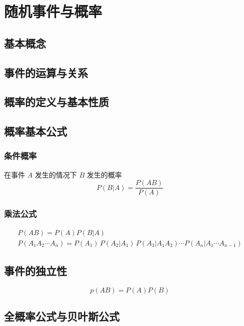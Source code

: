 \chapter{随机事件与概率}

\section{基本概念}
\label{sec:基本概念}

\section{事件的运算与关系}
\label{sec:事件的运算与关系}

\section{概率的定义与基本性质}
\label{sec:概率的定义与基本性质}

\section{概率基本公式}
\label{sec:概率基本公式}

\subsection{条件概率}
\label{sub:条件概率}


在事件 $A$ 发生的情况下 $B$ 发生的概率
\[
    P(B|A) = \frac{P(AB)}{P(A)}
\]

\subsection{乘法公式}
\label{sub:乘法公式}

\[
    \begin{aligned}
        P(AB) = P(A) P(B |  A) \\
        P(A_1 A_2 \cdots A_n) = P(A_1)\, P(A_2 | A_1) \, P(A_3 | A_1 A_2) \cdots P(A_n | A_1 \cdots A_{n-1})
    \end{aligned}
\]

\section{事件的独立性}
\label{sec:事件的独立性}

\[
    p(AB) = P(A) P(B)
\]

\section{全概率公式与贝叶斯公式}
\label{sec:全概率公式与贝叶斯公式}

